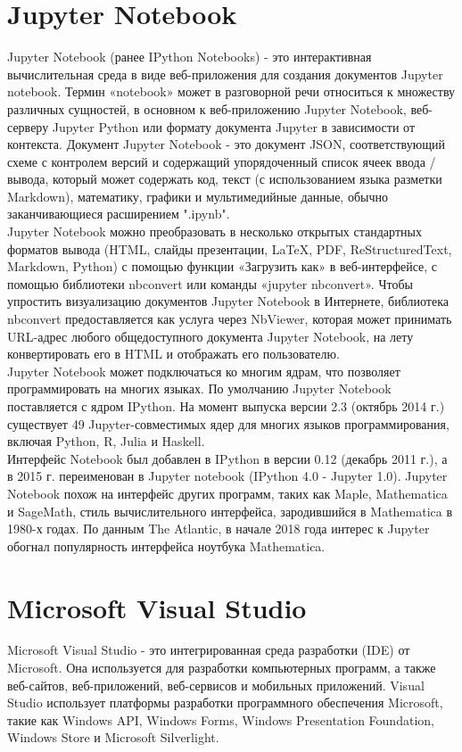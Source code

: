 \section{Jupyter Notebook}
Jupyter Notebook (ранее IPython Notebooks) - это интерактивная вычислительная среда в виде 
веб-приложения для создания документов Jupyter notebook. Термин «notebook» может в разговорной речи
относиться к множеству различных сущностей, в основном к веб-приложению Jupyter Notebook, 
веб-серверу Jupyter Python или формату документа Jupyter в зависимости от контекста. Документ 
Jupyter Notebook - это документ JSON, соответствующий схеме с контролем версий и содержащий 
упорядоченный список ячеек ввода / вывода, который может содержать код, текст (с использованием 
языка разметки Markdown), математику, графики и мультимедийные данные, обычно заканчивающиеся 
расширением ".ipynb".\\

Jupyter Notebook можно преобразовать в несколько открытых стандартных форматов вывода (HTML, 
слайды презентации, LaTeX, PDF, ReStructuredText, Markdown, Python) с помощью функции 
«Загрузить как» в веб-интерфейсе, с помощью библиотеки nbconvert или команды «jupyter nbconvert». 
Чтобы упростить визуализацию документов Jupyter Notebook в Интернете, библиотека nbconvert 
предоставляется как услуга через NbViewer, которая может принимать URL-адрес любого общедоступного
документа Jupyter Notebook, на лету конвертировать его в HTML и отображать его пользователю.\\

Jupyter Notebook может подключаться ко многим ядрам, что позволяет программировать на многих языках. 
По умолчанию Jupyter Notebook поставляется с ядром IPython. На момент выпуска версии 2.3 
(октябрь 2014 г.) существует 49 Jupyter-совместимых ядер для многих языков программирования, включая
Python, R, Julia и Haskell.\\

Интерфейс Notebook был добавлен в IPython в версии 0.12 (декабрь 2011 г.), а в 2015 г. переименован 
в Jupyter notebook (IPython 4.0 - Jupyter 1.0). Jupyter Notebook похож на интерфейс других программ, 
таких как Maple, Mathematica и SageMath, стиль вычислительного интерфейса, зародившийся в Mathematica 
в 1980-х годах. По данным The Atlantic, в начале 2018 года интерес к Jupyter обогнал популярность
интерфейса ноутбука Mathematica.\\

\section{Microsoft Visual Studio}
Microsoft Visual Studio - это интегрированная среда разработки (IDE) от Microsoft. Она используется 
для разработки компьютерных программ, а также веб-сайтов, веб-приложений, веб-сервисов и мобильных
приложений. Visual Studio использует платформы разработки программного обеспечения Microsoft, такие 
как Windows API, Windows Forms, Windows Presentation Foundation, Windows Store и Microsoft 
Silverlight.\\

